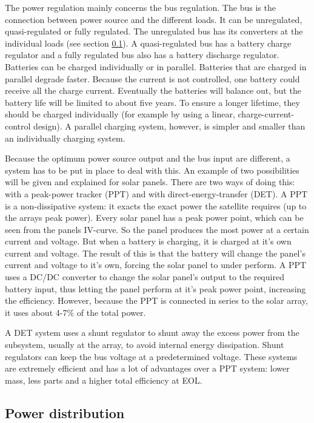 The power regulation mainly concerns the bus regulation. The bus is the connection between power source and the different loads. It can be unregulated, quasi-regulated or fully regulated. The unregulated bus has its converters at the individual loads (see section \ref{blDOdistribution}).
A quasi-regulated bus has a battery charge regulator and a fully regulated bus also has a battery discharge regulator.
Batteries can be charged individually or in parallel. Batteries that are charged in parallel degrade faster. Because the current is not controlled, one battery could receive all the charge current. Eventually the batteries will balance out, but the battery life will be limited to about five years. To ensure a longer lifetime, they should be charged individually (for example by using a linear, charge-current-control design). A parallel charging system, however, is simpler and smaller than an individually charging system.

Because the optimum power source output and the bus input are different, a system has to be put in place to deal with this. An example of two possibilities will be given and explained for solar panels.
There are two ways of doing this: with a peak-power tracker (PPT) and with direct-energy-transfer (DET). 
A PPT is a non-dissipative system: it exacts the exact power the satellite requires (up to the arrays peak power). Every solar panel has a peak power point, which can be seen from the panels IV-curve. So the panel produces the most power at a certain current and voltage. But when a battery is charging, it is charged at it's own current and voltage. The result of this is that the battery will change the panel's current and voltage to it's own, forcing the solar panel to under perform. A PPT uses a DC/DC converter to change the solar panel's output to the required battery input, thus letting the panel perform at it's peak power point, increasing the efficiency. However, because the PPT is connected in series to the solar array, it uses about 4-7\% of the total power.

A DET system uses a shunt regulator to shunt away the excess power from the subsystem, usually at the array, to avoid internal energy dissipation. Shunt regulators can keep the bus voltage at a predetermined voltage. These systems are extremely efficient and has a lot of advantages over a PPT system: lower mass, less parts and a higher total efficiency at EOL.

\subsection{Power distribution}
\label{blDOdistribution}

